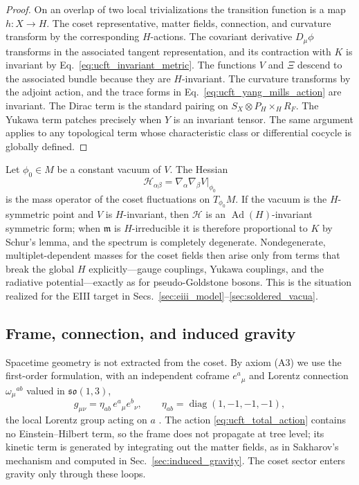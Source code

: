 \documentclass[aps,prd,preprint,longbibliography,nofootinbib,superscriptaddress,floatfix]{revtex4-2}
\newcommand{\Ad}{\operatorname{Ad}}
\newcommand{\diag}{\operatorname{diag}}
\begin{document}
\begin{proof}
On an overlap of two local trivializations the transition function is a map
\(h:X\to H\). The coset representative, matter fields, connection, and
curvature transform by the corresponding \(H\)-actions. The covariant
derivative \(D_\mu\phi\) transforms in the associated tangent representation,
and its contraction with \(K\) is invariant by
Eq.~\eqref{eq:ucft_invariant_metric}. The functions \(V\) and \(\Xi\) descend
to the associated bundle because they are \(H\)-invariant. The curvature
transforms by the adjoint action, and the trace forms in
Eq.~\eqref{eq:ucft_yang_mills_action} are invariant. The Dirac term is the
standard pairing on \(S_X\otimes P_H\times_H R_F\). The Yukawa term patches
precisely when \(Y\) is an invariant tensor. The same argument applies to any
topological term whose characteristic class or differential cocycle is globally
defined.
\end{proof}

Let \(\phi_0\in M\) be a constant vacuum of \(V\). The Hessian
\begin{equation}
    \mathcal H_{\alpha\beta}
    =
    \nabla_\alpha\nabla_\beta V\big|_{\phi_0}
    \label{eq:ucft_hessian}
\end{equation}
is the mass operator of the coset fluctuations on \(T_{\phi_0}M\). If the vacuum
is the \(H\)-symmetric point and \(V\) is \(H\)-invariant, then
\(\mathcal H\) is an \(\Ad(H)\)-invariant symmetric form; when \(\mathfrak m\)
is \(H\)-irreducible it is therefore proportional to \(K\) by Schur's lemma, and
the spectrum is completely degenerate. Nondegenerate, multiplet-dependent masses
for the coset fields then arise only from terms that break the global \(H\)
explicitly---gauge couplings, Yukawa couplings, and the radiative
potential---exactly as for pseudo-Goldstone bosons. This is the situation
realized for the EIII target in
Secs.~\ref{sec:eiii_model}--\ref{sec:soldered_vacua}.

\subsection{Frame, connection, and induced gravity}
\label{subsec:frame}

Spacetime geometry is not extracted from the coset. By axiom (A3) we use the
first-order formulation, with an independent coframe \(e^a{}_\mu\) and Lorentz
connection \(\omega_\mu{}^{ab}\) valued in \(\mathfrak{so}(1,3)\),
\begin{equation}
    g_{\mu\nu}=\eta_{ab}\,e^a{}_\mu e^b{}_\nu,
    \qquad
    \eta_{ab}=\diag(1,-1,-1,-1),
    \label{eq:ucft_independent_frame}
\end{equation}
the local Lorentz group acting on \(a\) \cite{KibbleSciama,HehlReview}. The
action \eqref{eq:ucft_total_action} contains no Einstein--Hilbert term, so the
frame does not propagate at tree level; its kinetic term is generated by
integrating out the matter fields, as in Sakharov's mechanism
\cite{SakharovInducedGravity,AdlerInducedGravity} and computed in
Sec.~\ref{sec:induced_gravity}. The coset sector enters gravity only through
these loops.
\end{document}
